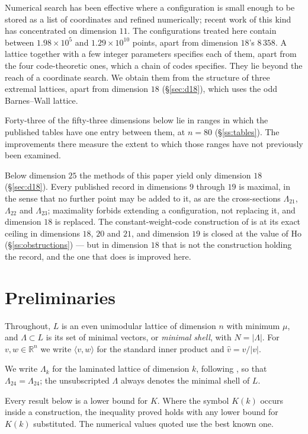 \documentclass[11pt]{amsart}
\theoremstyle{remark}
\newcommand{\Leech}{\Lambda_{24}}
\newcommand{\ip}[2]{\langle #1,#2\rangle}
\newcommand{\R}{\mathbb{R}}
\begin{document}
Numerical search has been effective where a configuration is small enough to be
stored as a list of coordinates and refined numerically; recent work of this kind
has concentrated on dimension $11$. The configurations treated here contain between
$1.98\times10^5$ and $1.29\times10^{10}$ points, apart from dimension $18$'s $8\,358$. A lattice together with a few
integer parameters specifies each of them, apart from the four code-theoretic
ones, which a chain of codes specifies. They lie beyond the reach of a
coordinate search. We obtain them from the structure of three extremal lattices,
apart from dimension $18$ (\S\ref{sec:d18}), which uses the odd Barnes--Wall lattice.

Forty-three of the fifty-three dimensions below lie in ranges in which the published
tables have one entry between them, at $n=80$ (\S\ref{ss:tables}). The improvements there measure the extent
to which those ranges have not previously been examined.

Below dimension $25$ the methods of this paper yield only dimension $18$
(\S\ref{sec:d18}). Every published record in dimensions $9$ through $19$ is
maximal, in the sense that no further point may be added to it, as are the
cross-sections $\Lambda_{21}$, $\Lambda_{22}$ and $\Lambda_{23}$; maximality
forbids extending a configuration, not replacing it, and dimension $18$ is
replaced. The constant-weight-code construction of \cite{cohn-li2024} is at its
exact ceiling in dimensions $18$, $20$ and $21$, and dimension $19$ is closed at
the value of Ho (\S\ref{ss:obstructions}) --- but in dimension $18$ that is not the
construction holding the record, and the one that does is improved here.


\section{Preliminaries}\label{sec:prelim}

Throughout, $L$ is an even unimodular lattice of dimension $n$ with minimum
$\mu$, and $\Lambda\subset L$ is its set of minimal vectors, or \emph{minimal
shell}, with $N=|\Lambda|$. For $v,w\in\R^n$ we write $\ip{v}{w}$ for the
standard inner product and $\hat v=v/|v|$.

We write $\Lambda_k$ for the laminated lattice of dimension $k$, following
\cite[Ch.~6]{conway-sloane1999}, so that $\Leech=\Lambda_{24}$; the unsubscripted
$\Lambda$ always denotes the minimal shell of $L$.

Every result below is a lower bound for $K$. Where the symbol $K(k)$ occurs
inside a construction, the inequality proved holds with any lower bound for
$K(k)$ substituted. The numerical values quoted use the best known one.
\end{document}
